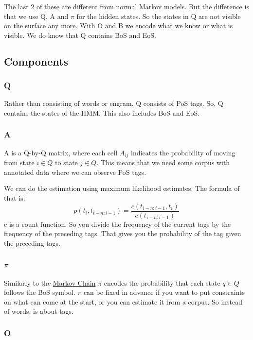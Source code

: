 \documentclass[
  11pt,
  british,
]{article}
\begin{document}
The last 2 of these are different from normal Markov models. But the
difference is that we use Q, A and \(\pi\) for the hidden states. So the
states in Q are not visible on the surface any more. With O and B we
encode what we know or what is visible. We do know that Q contains BoS
and EoS.

\hypertarget{components}{%
\subsection{Components}\label{components}}

\hypertarget{q}{%
\subsubsection{Q}\label{q}}

Rather than consisting of words or engram, Q consists of PoS tags. So, Q
contains the states of the HMM. This also includes BoS and EoS.

\hypertarget{a}{%
\subsubsection{A}\label{a}}

A is a \textbar Q\textbar-by-\textbar Q\textbar{} matrix, where each
cell \(A_{ij}\) indicates the probability of moving from state
\(i \in Q\) to state \(j \in Q\). This means that we need some corpus
with annotated data where we can observe PoS tags.

We can do the estimation using maximum likelihood estimates. The formula
of that is:
\[p(t_{i}, t_{i-n:i-1}) = \frac{c(t_{i-n:i-1}, t_{i})}{c(t_{i-n:i-1})}\]
c is a count function. So you divide the frequency of the current tags
by the frequency of the preceding tags. That gives you the probability
of the tag given the preceding tags.

\hypertarget{pi}{%
\subsubsection{\texorpdfstring{\(\pi\)}{\textbackslash pi}}\label{pi}}

Similarly to the \href{Markov\%20models.md}{Markov Chain} \(\pi\)
encodes the probability that each state \(q\in Q\) follows the BoS
symbol. \(\pi\) can be fixed in advance if you want to put constraints
on what can come at the start, or you can estimate it from a corpus. So
instead of words, is about tags.

\hypertarget{o}{%
\subsubsection{O}\label{o}}
\end{document}

